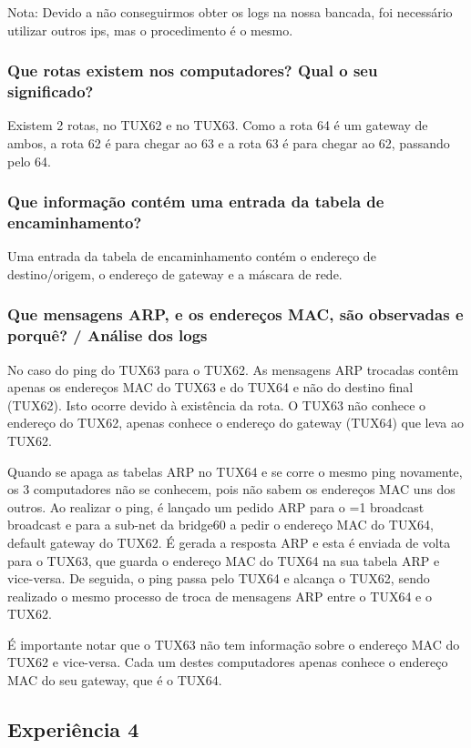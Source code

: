 \documentclass[11pt,a4paper,twocolumn]{article}
\newcommand{\hl}[2][1]{%
  \ifnum#1=1\relax
    \textcolor{text-hl1}{#2}%
  \else
    \textcolor{text-hl2}{#2}%
  \fi
}
\begin{document}
Nota: Devido a não conseguirmos obter os logs na nossa bancada, foi necessário utilizar outros ips, mas o procedimento é o mesmo.

\subsubsection{Que rotas existem nos computadores? Qual o seu significado?}
    
Existem 2 rotas, no TUX62 e no TUX63. Como a rota 64 é um gateway de ambos, a rota 62 é para chegar ao 63 e a rota 63 é para chegar ao 62, passando pelo 64. 

\subsubsection{Que informação contém uma entrada da tabela de encaminhamento?}

Uma entrada da tabela de encaminhamento contém o endereço de destino/origem, o endereço de gateway e a máscara de rede.

\subsubsection{ Que mensagens ARP, e os endereços MAC, são observadas e porquê? / Análise dos logs} 


No caso do ping do TUX63 para o TUX62. As mensagens ARP trocadas contêm apenas os endereços MAC do TUX63 e do TUX64 e não do destino final (TUX62). Isto ocorre devido à existência da rota. O TUX63 não conhece o endereço do TUX62, apenas conhece o endereço do gateway (TUX64) que leva ao TUX62.

Quando se apaga as tabelas ARP no TUX64 e se corre o mesmo ping novamente, os 3 computadores não se conhecem, pois não sabem os endereços MAC uns dos outros. Ao realizar o ping, é lançado um pedido ARP para o \hl{broadcast} e para a sub-net da bridge60 a pedir o endereço MAC do TUX64, default gateway do TUX62. É gerada a resposta ARP e esta é enviada de volta para o TUX63, que guarda o endereço MAC do TUX64 na sua tabela ARP e vice-versa. 
De seguida, o ping passa pelo TUX64 e alcança o TUX62, sendo realizado o mesmo processo de troca de mensagens ARP entre o TUX64 e o TUX62.

É importante notar que o TUX63 não tem informação sobre o endereço MAC do TUX62 e vice-versa. Cada um destes computadores apenas conhece o endereço MAC do seu gateway, que é o TUX64.

\subsection{Experiência 4}
\end{document}
